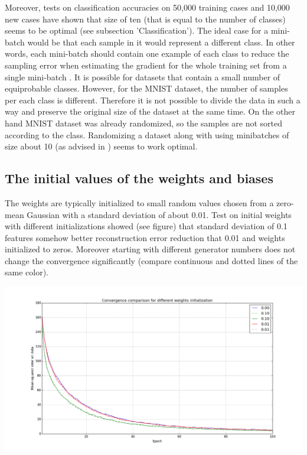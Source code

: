 \documentclass[a4paper]{scrartcl}
\begin{document}
Moreover, tests on classification accuracies on 50,000 training cases and 10,000 new cases have shown that size of ten (that is equal to the number of classes) seems to be optimal (see subsection 'Classification'). The ideal case for a mini-batch would be that each sample in it would represent a different class. In other words, each mini-batch should contain one example of each class to reduce the sampling error when estimating the gradient for the whole training set from a single mini-batch \cite{Hinton}. It is possible for datasets that contain a small number of equiprobable classes. However, for the MNIST dataset, the number of samples per each class is different. Therefore it is not possible to divide the data in such a way and preserve the original size of the dataset at the same time. On the other hand MNIST dataset was already randomized, so the samples are not sorted according to the class. Randomizing a dataset along with using minibatches of size about 10 (as advised in \cite{Hinton}) seems to work optimal.
\subsection{The initial values of the weights and biases}
The weights are typically initialized to small random values chosen from a zero-mean Gaussian with a standard deviation of about 0.01. Test on initial weights with different initializations showed (see figure) that standard deviation of 0.1 features somehow better reconstruction error reduction that 0.01 and weights initialized to zeros.
Moreover starting with different generator numbers does not change the convergence significantly (compare continuous and dotted lines of the same color).
\begin{center}
\includegraphics[width=14cm]{images/weights_seeds.png}
\end{center}
\end{document}
